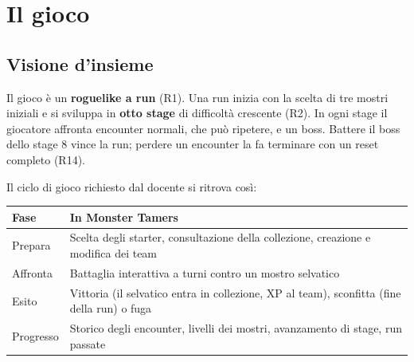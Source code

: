 \documentclass[11pt,a4paper]{article}
\begin{document}
\section{Il gioco}\label{sec:gioco}

\subsection{Visione d'insieme}

Il gioco è un \textbf{roguelike a run} (R1). Una run inizia con la scelta di tre mostri iniziali e si sviluppa in \textbf{otto stage} di difficoltà crescente (R2). In ogni stage il giocatore affronta encounter normali, che può ripetere, e un boss. Battere il boss dello stage 8 vince la run; perdere un encounter la fa terminare con un reset completo (R14).

Il ciclo di gioco richiesto dal docente si ritrova così:

\begin{tabularx}{\linewidth}{@{}L{2.4cm}Y@{}}
  \toprule
  Fase & In Monster Tamers \\
  \midrule
  Prepara & Scelta degli starter, consultazione della collezione, creazione e modifica dei team \\
  Affronta & Battaglia interattiva a turni contro un mostro selvatico \\
  Esito & Vittoria (il selvatico entra in collezione, XP al team), sconfitta (fine della run) o fuga \\
  Progresso & Storico degli encounter, livelli dei mostri, avanzamento di stage, run passate \\
  \bottomrule
\end{tabularx}
\end{document}
